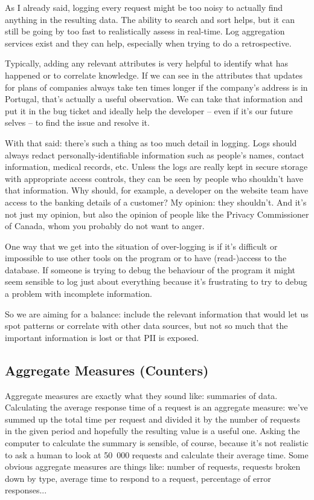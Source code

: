 As I already said, logging every request might be too noisy to actually find anything in the resulting data. The ability to search and sort helps, but it can still be going by too fast to realistically assess in real-time. Log aggregation services exist and they can help, especially when trying to do a retrospective.

Typically, adding any relevant attributes is very helpful to identify what has happened or to correlate knowledge. If we can see in the attributes that updates for plans of companies always take ten times longer if the company's address is in Portugal, that's actually a useful observation. We can take that information and put it in the bug ticket and ideally help the developer -- even if it's our future selves -- to find the issue and resolve it.

With that said: there's such a thing as too much detail in logging. Logs should always redact personally-identifiable information such as people's names, contact information, medical records, etc. Unless the logs are really kept in secure storage with appropriate access controls, they can be seen by people who shouldn't have that information. Why should, for example, a developer on the website team have access to the banking details of a customer? My opinion: they shouldn't. And it's not just my opinion, but also the opinion of people like the Privacy Commissioner of Canada, whom you probably do not want to anger.

One way that we get into the situation of over-logging is if it's difficult or impossible to use other tools on the program or to have (read-)access to the database. If someone is trying to debug the behaviour of the program it might seem sensible to log just about everything because it's frustrating to try to debug a problem with incomplete information. 

So we are aiming for a balance: include the relevant information that would let us spot patterns or correlate with other data sources, but not so much that the important information is lost or that PII is exposed.

\subsection*{Aggregate Measures (Counters)}

Aggregate measures are exactly what they sound like: summaries of data. Calculating the average response time of a request is an aggregate measure: we've summed up the total time per request and divided it by the number of requests in the given period and hopefully the resulting value is a useful one. Asking the computer to calculate the summary is sensible, of course, because it's not realistic to ask a human to look at 50~000 requests and calculate their average time. Some obvious aggregate measures are things like: number of requests, requests broken down by type, average time to respond to a request, percentage of error responses...  

